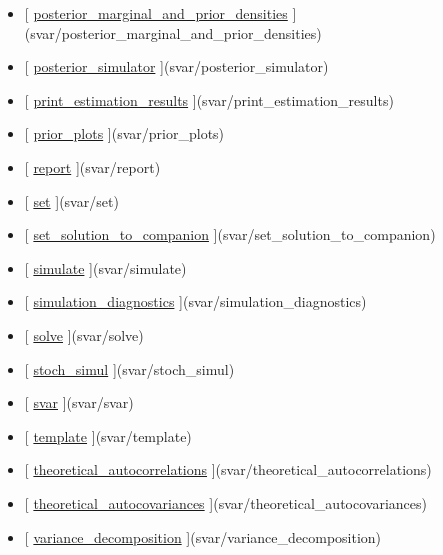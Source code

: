 \documentclass[letterpaper,10pt,english]{sphinxmanual}
\begin{document}
\begin{itemize}
\item {} 
{[} {\hyperref[classes/models/@svar/svar:posterior-marginal-and-prior-densities]{posterior\_marginal\_and\_prior\_densities}} {]}(svar/posterior\_marginal\_and\_prior\_densities)

\item {} 
{[} {\hyperref[classes/models/@svar/svar:posterior-simulator]{posterior\_simulator}} {]}(svar/posterior\_simulator)

\item {} 
{[} {\hyperref[classes/models/@svar/svar:print-estimation-results]{print\_estimation\_results}} {]}(svar/print\_estimation\_results)

\item {} 
{[} {\hyperref[classes/models/@svar/svar:prior-plots]{prior\_plots}} {]}(svar/prior\_plots)

\item {} 
{[} {\hyperref[classes/models/@svar/svar:report]{report}} {]}(svar/report)

\item {} 
{[} {\hyperref[classes/models/@svar/svar:set]{set}} {]}(svar/set)

\item {} 
{[} {\hyperref[classes/models/@svar/svar:set-solution-to-companion]{set\_solution\_to\_companion}} {]}(svar/set\_solution\_to\_companion)

\item {} 
{[} {\hyperref[classes/models/@svar/svar:simulate]{simulate}} {]}(svar/simulate)

\item {} 
{[} {\hyperref[classes/models/@svar/svar:simulation-diagnostics]{simulation\_diagnostics}} {]}(svar/simulation\_diagnostics)

\item {} 
{[} {\hyperref[classes/models/@svar/svar:solve]{solve}} {]}(svar/solve)

\item {} 
{[} {\hyperref[classes/models/@svar/svar:stoch-simul]{stoch\_simul}} {]}(svar/stoch\_simul)

\item {} 
{[} {\hyperref[classes/models/@svar/svar:svar]{svar}} {]}(svar/svar)

\item {} 
{[} {\hyperref[classes/models/@svar/svar:template]{template}} {]}(svar/template)

\item {} 
{[} {\hyperref[classes/models/@svar/svar:theoretical-autocorrelations]{theoretical\_autocorrelations}} {]}(svar/theoretical\_autocorrelations)

\item {} 
{[} {\hyperref[classes/models/@svar/svar:theoretical-autocovariances]{theoretical\_autocovariances}} {]}(svar/theoretical\_autocovariances)

\item {} 
{[} {\hyperref[classes/models/@svar/svar:variance-decomposition]{variance\_decomposition}} {]}(svar/variance\_decomposition)

\end{itemize}
\end{document}
